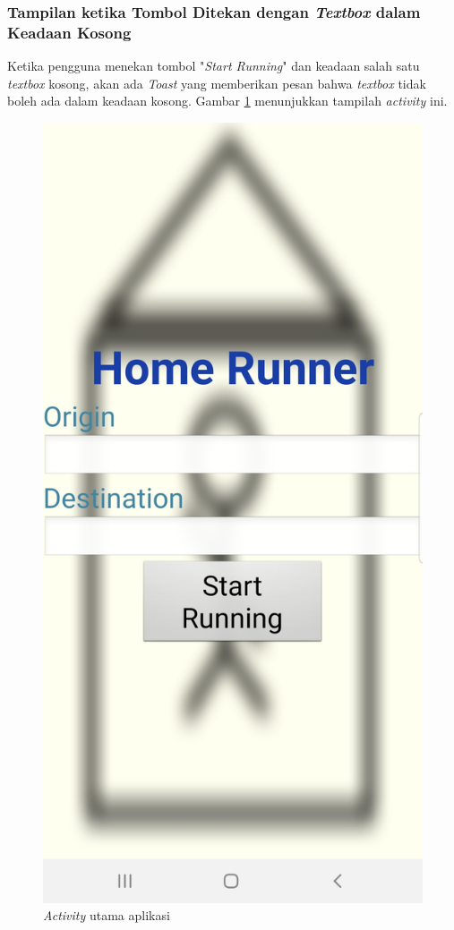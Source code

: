 \subsubsection{Tampilan ketika Tombol Ditekan dengan \textit{Textbox} dalam Keadaan Kosong}
Ketika pengguna menekan tombol "\textit{Start Running}" dan keadaan salah satu \textit{textbox} kosong, akan ada \textit{Toast} yang memberikan pesan bahwa \textit{textbox} tidak boleh ada dalam keadaan kosong. Gambar \ref{fig:main-page} menunjukkan tampilah \textit{activity} ini.

\begin{figure}
\centering
\includegraphics[scale=0.15]{Gambar/main-page.png}
    \caption{\textit{Activity} utama aplikasi}\label{fig:main-page}
\end{figure}

